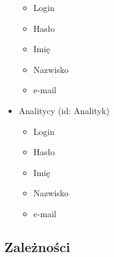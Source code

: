 \documentclass[12pt,a4paper]{article}
\begin{document}
\begin{itemize}
	\begin{itemize}
	\item Login
	\item Hasło
	\item Imię
	\item Nazwisko
	\item e-mail
	\end{itemize}
\item Analitycy (id: Analityk)
	\begin{itemize}
	\item Login
	\item Hasło
	\item Imię
	\item Nazwisko
	\item e-mail
	\end{itemize}
\end{itemize}

\subsection{Zależności}
\end{document}
